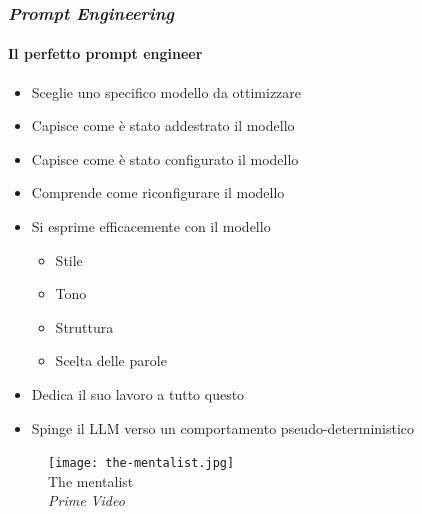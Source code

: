 \begin{frame}[t] \frametitle{\emph{Prompt Engineering}}
\framesubtitle{Il perfetto prompt engineer}
	{\footnotesize
	    \begin{minipage}[t]{\textwidth}
			\begin{minipage}[t]{0.6\textwidth}
	    		\begin{itemize}[leftmargin=10pt,align=right]
					\onslide<1->\item[\alert{\faArrowCircleRight}] Sceglie uno \alert{specifico} modello da ottimizzare
					\onslide<2->\item[\alert{\faArrowCircleRight}] Capisce come è stato addestrato il modello
					\onslide<3->\item[\alert{\faArrowCircleRight}] Capisce come è stato configurato il modello
                    \item[\alert{\faArrowCircleRight}] Comprende come riconfigurare il modello
					\onslide<5->\item[\alert{\faArrowCircleRight}] Si esprime efficacemente con il modello
                    \begin{itemize}[leftmargin=10pt,align=right]
                        \item[\alert{\faArrowCircleRight}] Stile
                        \item[\alert{\faArrowCircleRight}] Tono
                        \item[\alert{\faArrowCircleRight}] Struttura
                        \item[\alert{\faArrowCircleRight}] Scelta delle parole
                    \end{itemize}
                    \item[\alert{\faArrowCircleRight}] Dedica il suo lavoro a tutto questo
                    \item[\alert{\faExclamationTriangle}] Spinge il LLM verso un comportamento \alert{pseudo-deterministico}  
				\end{itemize}
            \end{minipage}
			\hfill
            \begin{minipage}[t]{0.4\textwidth}
                \centering
                \begin{figure}[ht]
                    \texttt{[image: the-mentalist.jpg]}
                    {\tiny\\The mentalist\\\vspace*{-1pt}\textit{\textcopyright Prime Video}}
                \end{figure}
            \end{minipage}
	    \end{minipage}
	}
\end{frame}
